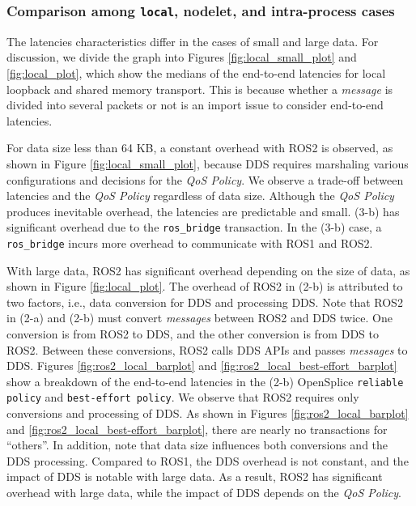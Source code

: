 \documentclass{sig-alternate-05-2015}
\begin{document}
\vspace{-3mm}
\subsubsection{Comparison among \texttt{local}, nodelet, and intra-process cases}
\label{sec:local}
The latencies characteristics differ in the cases of small and large data.
For discussion, we divide the graph into Figures \ref{fig:local_small_plot} and \ref{fig:local_plot}, which show the medians of the end-to-end latencies for local loopback and shared memory transport.
This is because whether a \emph{message} is divided into several packets or not is an import issue to consider end-to-end latencies.

For data size less than 64 KB, a constant overhead with ROS2 is observed, as shown in Figure \ref{fig:local_small_plot}, because DDS requires marshaling various configurations and decisions for the \emph{QoS Policy}.
We observe a trade-off between latencies and the \emph{QoS Policy} regardless of data size.
Although the \emph{QoS Policy} produces inevitable overhead, the latencies are predictable and small.
(3-b) has significant overhead due to the \texttt{ros\_bridge} transaction.
In the (3-b) case, a \texttt{ros\_bridge} incurs more overhead to communicate with ROS1 and ROS2.

With large data, ROS2 has significant overhead depending on the size of data, as shown in Figure \ref{fig:local_plot}.
The overhead of ROS2 in (2-b) is attributed to two factors, i.e., data conversion for DDS and processing DDS.
Note that ROS2 in (2-a) and (2-b) must convert \emph{messages} between ROS2 and DDS twice.
One conversion is from ROS2 to DDS, and the other conversion is from DDS to ROS2.
Between these conversions, ROS2 calls DDS APIs and passes \emph{messages} to DDS.
Figures \ref{fig:ros2_local_barplot} and \ref{fig:ros2_local_best-effort_barplot} show a breakdown of the end-to-end latencies in the (2-b) OpenSplice \texttt{reliable policy} and \texttt{best-effort policy}.
We observe that ROS2 requires only conversions and processing of DDS.
As shown in Figures \ref{fig:ros2_local_barplot} and \ref{fig:ros2_local_best-effort_barplot}, there are nearly no transactions for ``others''.
In addition, note that data size influences both conversions and the DDS processing.
Compared to ROS1, the DDS overhead is not constant, and the impact of DDS is notable with large data.
As a result, ROS2 has significant overhead with large data, while the impact of DDS depends on the \emph{QoS Policy}.
\end{document}
